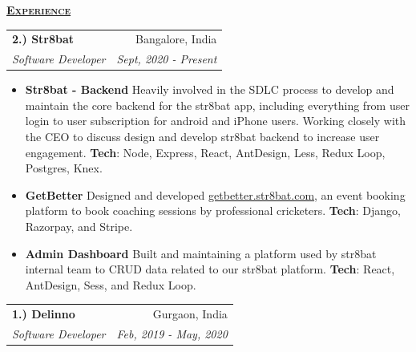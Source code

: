 \documentclass[11pt, a4paper]{article}
\begin{document}
\setlength\tabcolsep{0pt}
\begin{flushleft}
    \uline{\textsc{\large{\textbf{Experience}}}\hfill}
    \newline
    \newline
\setlength\tabcolsep{0pt}
\begin{tabularx}{\textwidth}{X r}
    \large{\textbf{2.) Str8bat}} & Bangalore, India\\
    \textit{Software Developer} & \textit {Sept, 2020 - Present}\\
\end{tabularx}
\begin{itemize}
    \textbf{Str8bat uses IoT based technology that gives real-time actionable insights to budding and professional cricket batters.
    }

    \textbf{Responsible}
    for the whole backend development, related integration with other platforms like SendGrid, MSG91, google, and apple for subscription-related things, mentoring juniors, interns, and everything else that comes with working in a small team startup.

    \item {\bf{Str8bat - Backend}}
    \newline
    Heavily involved in the SDLC process to develop and maintain the core backend for the str8bat app, including everything from user login to user subscription for android and iPhone users.
    Working closely with the CEO to discuss design and develop str8bat backend to increase user engagement.
    \newline
    \textbf{Tech}: Node, Express, React, AntDesign, Less, Redux Loop, Postgres, Knex. 
    \item {\bf{GetBetter}}
    \newline
    Designed and developed \href{https://getbetter.str8bat.com}{getbetter.str8bat.com}, an event booking platform to book coaching sessions by professional cricketers.
    \newline
    \textbf{Tech}: Django, Razorpay, and Stripe.
    \item {\bf{Admin Dashboard}}
    \newline
    Built and maintaining a platform used by str8bat internal team to CRUD data related to our str8bat platform.
    \newline
    \textbf{Tech}: React, AntDesign, Sess, and Redux Loop. 

\end{itemize}

    \begin{tabularx}{\textwidth}{X r}
        \large{\textbf{1.) Delinno}} & Gurgaon, India\\
        \textit{Software Developer}  & \textit {Feb, 2019 - May, 2020}\\
    \end{tabularx}
\end{flushleft}
\end{document}
